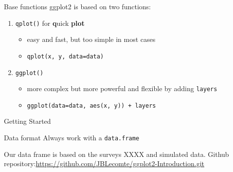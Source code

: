 \documentclass{beamer}\usepackage[]{graphicx}\usepackage[]{color}
\begin{document}
\begin{frame}{Base functions}
ggplot2 is based on two functions:
\begin{enumerate}
\item  \texttt{qplot()} for \textbf{q}uick \textbf{plot}
\begin{itemize}
\item easy and fast, but too simple in most cases
\item \texttt{qplot(x, y, data=data)}
\end{itemize}
\vspace{0.5cm}
\item \texttt{ggplot()}
\begin{itemize}
\item more complex but more powerful and flexible by adding \texttt{layers}
\item \texttt{ggplot(data=data, aes(x, y)) + layers}
\end{itemize}
\end{enumerate}
\end{frame}


\begin{frame}[fragile]{Getting Started}

\begin{alertblock}{Data format}
Always work with a \texttt{data.frame}
\end{alertblock}
Our data frame is based on the surveys XXXX and simulated data.
Github repository:\newline \url{https://github.com/JBLecomte/ggplot2-Introduction.git}
\end{frame}
\end{document}
